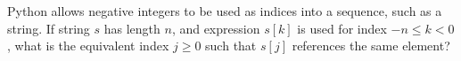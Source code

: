  \label{sssec:ex1_8}

Python allows negative integers to be used as indices into a sequence, such as a string. If string $s$ has length $n$, and expression $s[k]$ is used for index $-n\leq k<0$, what is the equivalent index $j\geq 0$ such that $s[j]$ references the same element?

